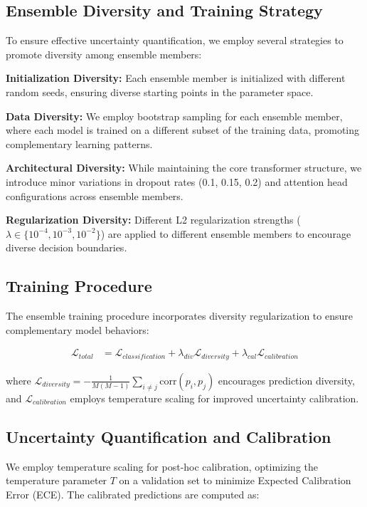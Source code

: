 \documentclass[journal]{IEEEtran}
\begin{document}
\subsection{Ensemble Diversity and Training Strategy}

To ensure effective uncertainty quantification, we employ several strategies to promote diversity among ensemble members:

\textbf{Initialization Diversity:} Each ensemble member is initialized with different random seeds, ensuring diverse starting points in the parameter space.

\textbf{Data Diversity:} We employ bootstrap sampling for each ensemble member, where each model is trained on a different subset of the training data, promoting complementary learning patterns.

\textbf{Architectural Diversity:} While maintaining the core transformer structure, we introduce minor variations in dropout rates (0.1, 0.15, 0.2) and attention head configurations across ensemble members.

\textbf{Regularization Diversity:} Different L2 regularization strengths ($\lambda \in \{10^{-4}, 10^{-3}, 10^{-2}\}$) are applied to different ensemble members to encourage diverse decision boundaries.

\subsection{Training Procedure}

The ensemble training procedure incorporates diversity regularization to ensure complementary model behaviors:

\begin{align}
\mathcal{L}_{total} &= \mathcal{L}_{classification} + \lambda_{div} \mathcal{L}_{diversity} + \lambda_{cal} \mathcal{L}_{calibration}
\end{align}

where $\mathcal{L}_{diversity} = -\frac{1}{M(M-1)} \sum_{i \neq j} \text{corr}(p_i, p_j)$ encourages prediction diversity, and $\mathcal{L}_{calibration}$ employs temperature scaling for improved uncertainty calibration.

\subsection{Uncertainty Quantification and Calibration}

We employ temperature scaling for post-hoc calibration, optimizing the temperature parameter $T$ on a validation set to minimize Expected Calibration Error (ECE). The calibrated predictions are computed as:
\end{document}
